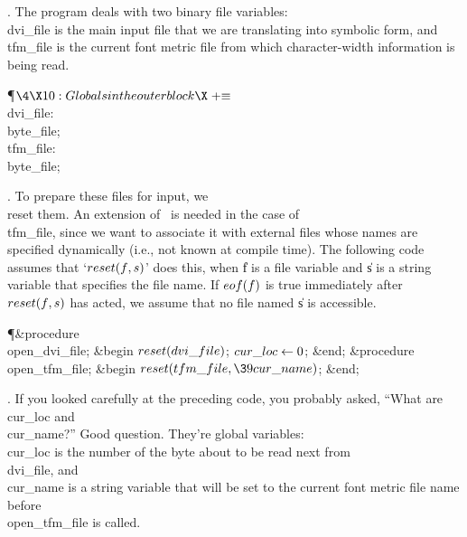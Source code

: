 . The program deals with two binary file variables: \\{dvi\_file} is the
main
input file that we are translating into symbolic form, and \\{tfm\_file} is
the current font metric file from which character-width information is
being read.

\Y\P$\4\X10:Globals in the outer block\X\mathrel{+}\S$\6
\4\\{dvi\_file}: \\{byte\_file};\6
\4\\{tfm\_file}: \\{byte\_file};\par
\fi

. To prepare these files for input, we \\{reset} them. An extension of
\PASCAL\ is needed in the case of \\{tfm\_file}, since we want to associate
it with external files whose names are specified dynamically (i.e., not
known at compile time). The following code assumes that `$\\{reset}(\|f,\|s)$'
does this, when \|f is a file variable and \|s is a string variable that
specifies the file name. If $\\{eof}(\|f)$ is true immediately after
$\\{reset}(\|f,\|s)$ has acted, we assume that no file named \|s is accessible.

\Y\P\4\&{procedure}\1\  \\{open\_dvi\_file};\2\6
\&{begin} $\\{reset}(\\{dvi\_file})$;\5
$\\{cur\_loc}\K0$;\6
\&{end};\7
\4\&{procedure}\1\  \\{open\_tfm\_file};\2\6
\&{begin} $\\{reset}(\\{tfm\_file},\39\\{cur\_name})$;\6
\&{end};\par
\fi

. If you looked carefully at the preceding code, you probably asked,
``What are \\{cur\_loc} and \\{cur\_name}?'' Good question. They're global
variables: \\{cur\_loc} is the number of the byte about to be read next from
\\{dvi\_file}, and \\{cur\_name} is a string variable that will be set to the
current font metric file name before \\{open\_tfm\_file} is called.

